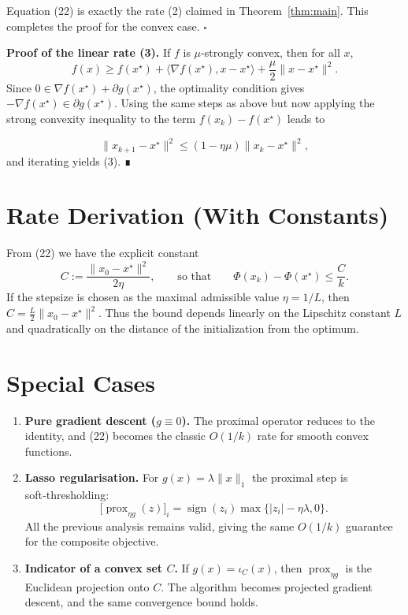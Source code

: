 \documentclass{article}
\newcommand{\prox}{\operatorname{prox}}
\begin{document}
\begin{enumerate}
Equation (22) is exactly the rate (2) claimed in Theorem~\ref{thm:main}.  This completes the proof for the convex case. \hfill $\square$

\medskip
\noindent\textbf{Proof of the linear rate (3).}  If $f$ is $\mu$‑strongly convex, then for all $x$,
\[
f(x)\ge f(x^{\star})+\langle\nabla f(x^{\star}),x-x^{\star}\rangle+\frac{\mu}{2}\|x-x^{\star}\|^{2}.
\]
Since $0\in\nabla f(x^{\star})+\partial g(x^{\star})$, the optimality condition gives $-\nabla f(x^{\star})\in\partial g(x^{\star})$.  Using the same steps as above but now applying the strong convexity inequality to the term $f(x_{k})-f(x^{\star})$ leads to  

\[
\|x_{k+1}-x^{\star}\|^{2}\le (1-\eta\mu)\|x_{k}-x^{\star}\|^{2},
\]
and iterating yields (3).  ∎

\section*{Rate Derivation (With Constants)}
From (22) we have the explicit constant
\[
C:=\frac{\|x_{0}-x^{\star}\|^{2}}{2\eta},
\qquad\text{so that}\qquad
\Phi(x_{k})-\Phi(x^{\star})\le \frac{C}{k}.
\]
If the stepsize is chosen as the maximal admissible value $\eta=1/L$, then $C=\frac{L}{2}\|x_{0}-x^{\star}\|^{2}$.  Thus the bound depends linearly on the Lipschitz constant $L$ and quadratically on the distance of the initialization from the optimum.

\section*{Special Cases}
\begin{enumerate}[nosep]
\item \textbf{Pure gradient descent ($g\equiv0$).}  The proximal operator reduces to the identity, and (22) becomes the classic $O(1/k)$ rate for smooth convex functions.

\item \textbf{Lasso regularisation.}  For $g(x)=\lambda\|x\|_{1}$ the proximal step is soft‑thresholding:
\[
\bigl[\prox_{\eta g}(z)\bigr]_{i}= \operatorname{sign}(z_{i})\max\{|z_{i}|-\eta\lambda,0\}.
\]
All the previous analysis remains valid, giving the same $O(1/k)$ guarantee for the composite objective.

\item \textbf{Indicator of a convex set $C$.}  If $g(x)=\iota_{C}(x)$, then $\prox_{\eta g}$ is the Euclidean projection onto $C$.  The algorithm becomes projected gradient descent, and the same convergence bound holds.


\end{enumerate}
\end{enumerate}
\end{document}
